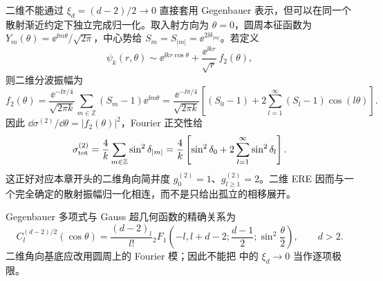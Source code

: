 二维不能通过 $\xi_d=(d-2)/2\to0$ 直接套用 Gegenbauer 表示，但可以在同一个散射渐近约定下独立完成归一化。取入射方向为 $\theta=0$，圆周本征函数为 $Y_m(\theta)=\ee^{\ii m\theta}/\sqrt{2\pi}$，中心势给 $S_m=S_{|m|}=\ee^{2\ii\delta_{|m|}}$。若定义
\[
\psi_k(r,\theta)\sim \ee^{\ii kr\cos\theta}
+\frac{\ee^{\ii kr}}{\sqrt r}\,f_2(\theta),
\]
则二维分波振幅为
\begin{equation}
 f_2(\theta)
 =\frac{\ee^{-\ii\pi/4}}{\sqrt{2\pi k}}
 \sum_{m\in\mathbb Z}(S_m-1)\ee^{\ii m\theta}
 =\frac{\ee^{-\ii\pi/4}}{\sqrt{2\pi k}}
 \left[(S_0-1)+2\sum_{l=1}^{\infty}(S_l-1)\cos(l\theta)\right].
\label{eq:phys-hdqm-2d-partial-wave-amplitude}
\end{equation}
因此 $\dd\sigma^{(2)}/\dd\theta=|f_2(\theta)|^2$，Fourier 正交性给
\begin{equation}
\sigma_{\rm tot}^{(2)}
=\frac4k\sum_{m\in\mathbb Z}\sin^2\delta_{|m|}
=\frac4k\left[\sin^2\delta_0+2\sum_{l=1}^{\infty}\sin^2\delta_l\right].
\label{eq:phys-hdqm-2d-cross-section}
\end{equation}
这正好对应本章开头的二维角向简并度 $g_0^{(2)}=1$、$g_{l\ge1}^{(2)}=2$。二维 ERE 因而与一个完全确定的散射振幅归一化相连，而不是只给出孤立的相移展开。

Gegenbauer 多项式与 Gauss 超几何函数的精确关系为
\begin{equation}
C_l^{(d-2)/2}(\cos\theta)
=\frac{(d-2)_l}{l!}
{}_2F_1\!\left(
-l,l+d-2;\frac{d-1}{2};\sin^2\frac\theta2
\right),
\qquad d>2.
\label{eq:phys-hdqm-gegenbauer-2f1}
\end{equation}
二维角向基底应改用圆周上的 Fourier 模；因此不能把 中的 $\xi_d\to0$ 当作逐项极限。

